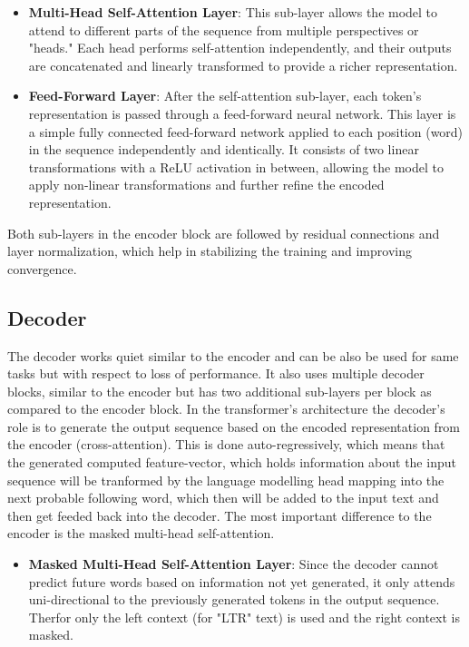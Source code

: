 \begin{itemize}
    \item \textbf{Multi-Head Self-Attention Layer}: This sub-layer allows the model to attend to different parts of the sequence from multiple perspectives or "heads." Each head performs self-attention independently, and their outputs are concatenated and linearly transformed to provide a richer representation.

    \item \textbf{Feed-Forward Layer}: After the self-attention sub-layer, each token's representation is passed through a feed-forward neural network. This layer is a simple fully connected feed-forward network applied to each position (word) in the sequence independently and identically. It consists of two linear transformations with a ReLU activation in between, allowing the model to apply non-linear transformations and further refine the encoded representation.
\end{itemize}

Both sub-layers in the encoder block are followed by residual connections and layer normalization, which help in stabilizing the training and improving convergence.

\subsection{Decoder}
The decoder works quiet similar to the encoder and can be also be used for same tasks but with respect to loss of performance. It also uses multiple decoder blocks, similar to the encoder but has two additional sub-layers per block as compared to the encoder block. In the transformer's architecture the decoder's role is to generate the output sequence based on the encoded representation from the encoder (cross-attention). This is done auto-regressively, which means that the generated computed feature-vector, which holds information about the input sequence will be tranformed by the language modelling head mapping into the next probable following word, which then will be added to the input text and then get feeded back into the decoder. The most important difference to the encoder is the masked multi-head self-attention.

\begin{itemize}
    \item \textbf{Masked Multi-Head Self-Attention Layer}:
          Since the decoder cannot predict future words based on information not yet generated, it only attends uni-directional to the previously generated tokens in the output sequence. Therfor only the left context (for "LTR" text) is used and the right context is masked.
\end{itemize}





